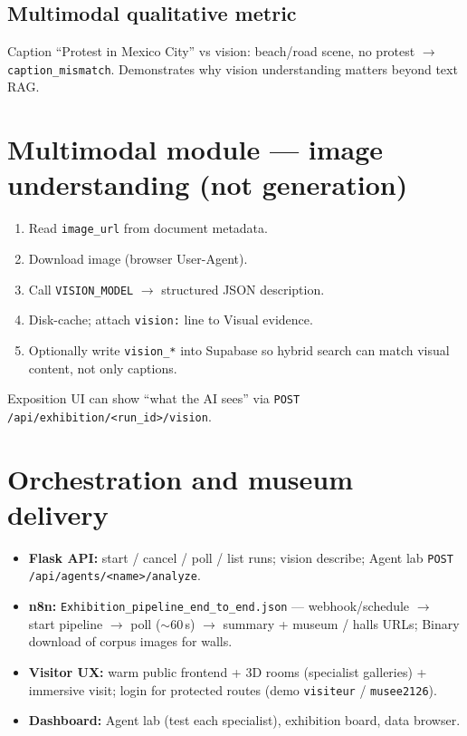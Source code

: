 \documentclass[11pt,a4paper]{article}
\begin{document}
\subsection{Multimodal qualitative metric}

Caption ``Protest in Mexico City'' vs vision: beach/road scene, no protest
$\rightarrow$ \texttt{caption\_mismatch}. Demonstrates why vision understanding
matters beyond text RAG.

\section{Multimodal module --- image understanding (not generation)}

\begin{enumerate}[leftmargin=*]
  \item Read \texttt{image\_url} from document metadata.
  \item Download image (browser User-Agent).
  \item Call \texttt{VISION\_MODEL} $\rightarrow$ structured JSON description.
  \item Disk-cache; attach \texttt{vision:} line to Visual evidence.
  \item Optionally write \texttt{vision\_*} into Supabase so hybrid search can
        match visual content, not only captions.
\end{enumerate}

\noindent Exposition UI can show ``what the AI sees'' via
\texttt{POST /api/exhibition/<run\_id>/vision}.

\section{Orchestration and museum delivery}

\begin{itemize}[leftmargin=*]
  \item \textbf{Flask API:} start / cancel / poll / list runs; vision describe;
        Agent lab \texttt{POST /api/agents/<name>/analyze}.
  \item \textbf{n8n:} \texttt{Exhibition\_pipeline\_end\_to\_end.json} ---
        webhook/schedule $\rightarrow$ start pipeline $\rightarrow$ poll
        ($\sim$60\,s) $\rightarrow$ summary + museum / halls URLs; Binary
        download of corpus images for walls.
  \item \textbf{Visitor UX:} warm public frontend + 3D rooms (specialist
        galleries) + immersive visit; login for protected routes
        (demo \texttt{visiteur} / \texttt{musee2126}).
  \item \textbf{Dashboard:} Agent lab (test each specialist), exhibition board,
        data browser.
\end{itemize}
\end{document}
